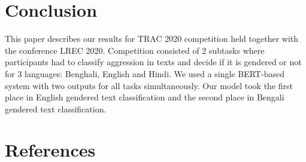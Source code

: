 \documentclass[10pt, a4paper]{article}
\begin{document}
\section{Conclusion}
This paper describes our results for TRAC 2020 competition held together with the conference LREC 2020. Competition consisted of 2 subtasks where participants had to classify aggression in texts and decide if it is gendered or not for 3 languages: Benghali, English and Hindi. We used a single BERT-based system with two outputs for all tasks simultaneously. Our model took the first place in English gendered text classification and the second place in Bengali gendered text classification.

\section{References}


\end{document}
